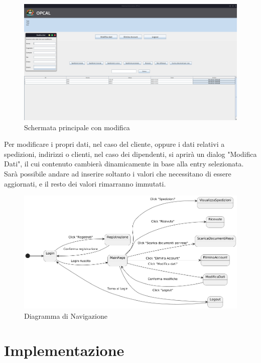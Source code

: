 \begin{figure}[H]
	\includegraphics[width=\textwidth]{assets/modification_page.png}
	\caption{Schermata principale con modifica}
\end{figure}
Per modificare i propri dati, nel caso del cliente, oppure i dati relativi a spedizioni, indirizzi o clienti, nel caso dei dipendenti, si aprirà un dialog "Modifica Dati", il cui contenuto cambierà dinamicamente in base alla entry selezionata. Sarà possibile andare ad inserire soltanto i valori che necessitano di essere aggiornati, e il resto dei valori rimarranno immutati.
\begin{figure}[H]
	\includegraphics[width=\textwidth]{assets/diagramma_navigazione.png}
	\caption{Diagramma di Navigazione}
\end{figure}
\section{Implementazione}
